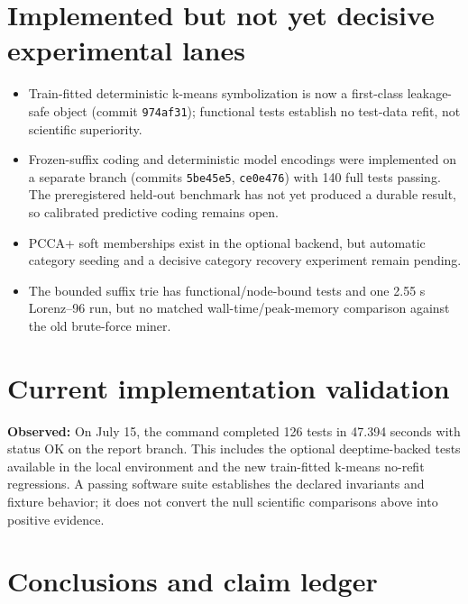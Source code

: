 \documentclass[11pt]{article}
\newcommand{\observed}{\textbf{Observed:}}
\begin{document}
\section{Implemented but not yet decisive experimental lanes}

\begin{itemize}
\item Train-fitted deterministic k-means symbolization is now a first-class
leakage-safe object (commit \texttt{974af31}); functional tests establish no
test-data refit, not scientific superiority.
\item Frozen-suffix coding and deterministic model encodings were implemented
on a separate branch (commits \texttt{5be45e5}, \texttt{ce0e476}) with 140 full
tests passing. The preregistered held-out benchmark has not yet produced a
durable result, so calibrated predictive coding remains open.
\item PCCA+ soft memberships exist in the optional backend, but automatic
category seeding and a decisive category recovery experiment remain pending.
\item The bounded suffix trie has functional/node-bound tests and one 2.55 s
Lorenz--96 run, but no matched wall-time/peak-memory comparison against the old
brute-force miner.
\end{itemize}

\section{Current implementation validation}

\observed{} On July 15, the command
 completed 126
tests in 47.394 seconds with status OK on the report branch. This includes the
optional deeptime-backed tests available in the local environment and the new
train-fitted k-means no-refit regressions. A passing software suite establishes
the declared invariants and fixture behavior; it does not convert the null
scientific comparisons above into positive evidence.

\section{Conclusions and claim ledger}
\end{document}
